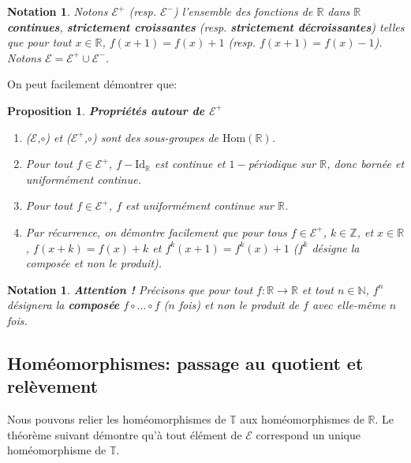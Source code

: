 \documentclass[11pt,a4 paper]{article}
\newtheorem{propriete}[theoreme]{Proposition}
\newtheorem{nota}[theoreme]{Notation}
\newcommand{\Tbb}{\mathbb{T}}
\newcommand{\Rbb}{\mathbb{R}}
\newcommand{\Ec}{\mathcal{E}}
\newenvironment{ppt}{\begin{box_ppt}\begin{propriete}}{\end{propriete}\end{box_ppt}}
\begin{document}
\begin{nota}
	Notons $\mathcal{E}^+$ (resp. $\Ec^-$) l'ensemble des fonctions de $\mathbb{R}$ dans $\mathbb{R}$ \textbf{continues}, \textbf{strictement croissantes} (resp. \textbf{strictement décroissantes}) telles que pour tout $x \in \mathbb{R}$, $f(x+1) = f(x)+1$ (resp. $f(x+1)=f(x)-1$). Notons $\Ec = \Ec^+ \cup \Ec^-$.
\end{nota}
	On peut facilement démontrer que:
	
\begin{ppt}\label{E+}\textbf{Propriétés autour de $\Ec^+$}
	\begin{enumerate}
	\item ($\Ec$,$\circ$) et ($\mathcal{E}^+$,$\circ$) sont des sous-groupes de $\mathrm{Hom}(\mathbb{R})$.
	\item Pour tout $f \in \mathcal{E}^+$, $f - \mathrm{Id_{\mathbb{R}}}$ est continue et $1-$périodique sur $\mathbb{R}$, donc bornée et uniformément continue.
	\item Pour tout  $f \in \mathcal{E}^+$, $f$ est uniformément continue sur $\mathbb{R}$.
	\item	Par récurrence, on démontre facilement que pour tous $f \in \mathcal{E}^+$, $k \in \mathbb{Z}$, et $x \in \mathbb{R}$, $f(x+k)=f(x)+k$ et $f^k(x+1)=f^k(x)+1$ ($f^k$ désigne la composée et non le produit).
\end{enumerate}
	\end{ppt}






\begin{nota}
	\textbf{Attention !}  Précisons que pour tout $f: \Rbb \to \Rbb$ et tout $n\in \mathbb{N}$, $f^n$ désignera la \textbf{composée} $f\circ...\circ f$ ($n$ fois) et non le produit de $f$ avec elle-même $n$ fois.
\end{nota}











\subsection{Homéomorphismes: passage au quotient et relèvement}
	Nous pouvons relier les homéomorphismes de $\Tbb$ aux homéomorphismes de $\Rbb$. Le théorème suivant démontre qu'à tout élément de $\Ec$ correspond un unique homéomorphisme de $\Tbb$.
	
\end{document}
